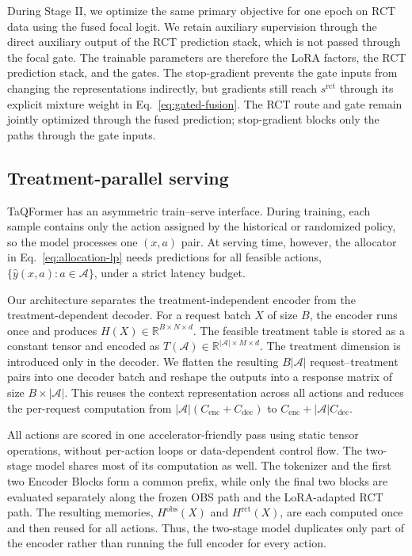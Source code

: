 \documentclass[sigconf,nonacm]{acmart}
\newcommand{\model}{TaQFormer\xspace}
\begin{document}
During Stage II, we optimize the same primary objective for one epoch on RCT data using the fused focal logit. We retain auxiliary supervision through the direct auxiliary output of the RCT prediction stack, which is not passed through the focal gate. The trainable parameters are therefore the LoRA factors, the RCT prediction stack, and the gates. The stop-gradient prevents the gate inputs from changing the representations indirectly, but gradients still reach $s^{\mathrm{rct}}$ through its explicit mixture weight in Eq.~\eqref{eq:gated-fusion}. The RCT route and gate remain jointly optimized through the fused prediction; stop-gradient blocks only the paths through the gate inputs.


\subsection{Treatment-parallel serving}
\label{sec:serving}

\model has an asymmetric train--serve interface. During training, each sample
contains only the action assigned by the historical or randomized policy, so
the model processes one $(x,a)$ pair. At serving time, however, the allocator
in Eq.~\eqref{eq:allocation-lp} needs predictions for all feasible actions,
$\{\hat y(x,a):a\in\mathcal A\}$, under a strict latency budget.

Our architecture separates the treatment-independent encoder from the
treatment-dependent decoder. For a request batch $X$ of size $B$, the encoder
runs once and produces $H(X)\in\mathbb{R}^{B\times N\times d}$. The feasible
treatment table is stored as a constant tensor and encoded as
$T(\mathcal A)\in\mathbb{R}^{|\mathcal A|\times M\times d}$. The treatment
dimension is introduced only in the decoder. We flatten the resulting
$B|\mathcal A|$ request--treatment pairs into one decoder batch and reshape the
outputs into a response matrix of size $B\times|\mathcal A|$. This
reuses the context representation across all actions and reduces the
per-request computation from
$|\mathcal A|(C_{\mathrm{enc}}+C_{\mathrm{dec}})$ to
$C_{\mathrm{enc}}+|\mathcal A|C_{\mathrm{dec}}$.

All actions are scored in one accelerator-friendly pass using static tensor
operations, without per-action loops or data-dependent control flow. The
two-stage model shares most of its computation as well. The tokenizer and the
first two Encoder Blocks form a common prefix, while only the final two
blocks are evaluated separately along the frozen OBS path and the
LoRA-adapted RCT path. The resulting memories,
$H^{\mathrm{obs}}(X)$ and $H^{\mathrm{rct}}(X)$, are each computed once and
then reused for all actions. Thus, the two-stage model duplicates only part
of the encoder rather than running the full encoder for every action.
\end{document}
